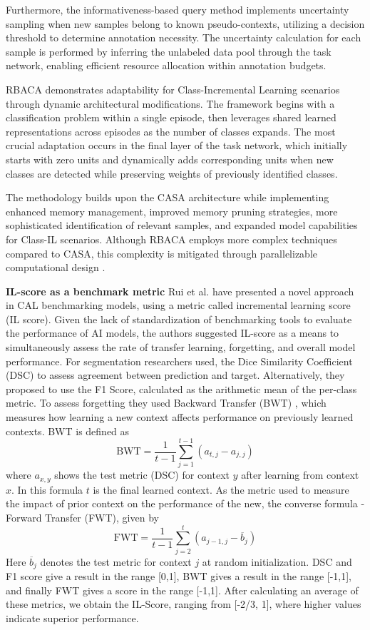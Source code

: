 \documentclass{IEEEcsmag}
\begin{document}
    Furthermore, the informativeness-based query method implements uncertainty sampling when new samples belong to known pseudo-contexts, utilizing a decision threshold to determine annotation necessity. 
    The uncertainty calculation for each sample is performed by inferring the unlabeled data pool through the task network, enabling efficient resource allocation within annotation budgets\cite{cite-19}.
    
    RBACA demonstrates adaptability for Class-Incremental Learning scenarios through dynamic architectural modifications. 
    The framework begins with a classification problem within a single episode, then leverages shared learned representations across episodes as the number of classes expands\cite{cite-19}.
    The most crucial adaptation occurs in the final layer of the task network, which initially starts with zero units and dynamically adds corresponding units when new classes are detected while preserving weights of previously identified classes\cite{cite-19}.
    
    The methodology builds upon the CASA architecture while implementing enhanced memory management, improved memory pruning strategies, more sophisticated identification of relevant samples, and expanded model capabilities for Class-IL scenarios.
    Although RBACA employs more complex techniques compared to CASA, this complexity is mitigated through parallelizable computational design .

    \textbf{IL-score as a benchmark metric}
    Rui et al. \cite{cite-19} have presented a novel approach in CAL benchmarking models, using a metric called incremental learning score (IL score).
    Given the lack of standardization of benchmarking tools to evaluate the performance of AI models, the authors suggested IL-score as a means to simultaneously assess the rate of transfer learning, forgetting, and overall model performance.
    For segmentation researchers used, the Dice Similarity Coefficient (DSC) to assess agreement between prediction and target.
    Alternatively, they proposed to use the F1 Score, calculated as the arithmetic mean of the per-class metric.
    To assess forgetting they used Backward Transfer (BWT) \cite{cite-30}, which measures how learning a new context affects performance on previously learned contexts\cite{cite-19}.
    BWT is defined as
    $$
    \mathrm{BWT} =\frac{1}{t-1} \sum_{j=1}^{t-1} (a_{t,j} - a_{j,j})
    $$
    where $a_{x,y}$ shows the test metric (DSC) for context $y$ after learning from context $x$.
    In this formula $t$ is the final learned context.
    As the metric used to measure the impact of prior context on the performance of the new, the converse formula - Forward Transfer (FWT), given by
    $$
    \mathrm{FWT} = \frac{1}{t-1} \sum_{j=2}^{t} \left( a_{j-1,j} - \overline{b}_j \right)
    $$
    Here $\overline{b}_j$ denotes the test metric for context $j$ at random initialization.
    DSC and F1 score give a result in the range [0,1], BWT gives a result in the range [-1,1], and finally FWT gives a score in the range [-1,1].
    After calculating an average of these metrics, we obtain the IL-Score, ranging from [-2/3, 1], where higher values indicate superior performance\cite{cite-19}. 
    
\end{document}
